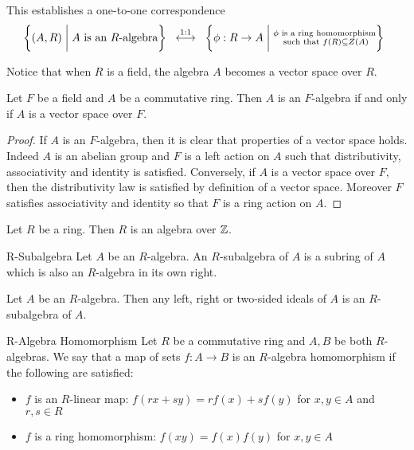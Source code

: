 \documentclass[a4paper]{article}
\begin{document}
This establishes a one-to-one correspondence $$\left\{(A,R)\;\bigg{|}\;A\text{ is an }R\text{-algebra}\right\}\;\;\overset{1:1}{\longleftrightarrow}\;\;\left\{\phi:R\to A\;\bigg{|}\;\substack{\phi\text{ is a ring homomorphism}\\\text{ such that }f(R)\subseteq Z(A)}\right\}\;\;$$

Notice that when $R$ is a field, the algebra $A$ becomes a vector space over $R$. 

\begin{lmm}{}{} Let $F$ be a field and $A$ be a commutative ring. Then $A$ is an $F$-algebra if and only if $A$ is a vector space over $F$. \tcbline
\begin{proof}
If $A$ is an $F$-algebra, then it is clear that properties of a vector space holds. Indeed $A$ is an abelian group and $F$ is a left action on $A$ such that distributivity, associativity and identity is satisfied. Conversely, if $A$ is a vector space over $F$, then the distributivity law is satisfied by definition of a vector space. Moreover $F$ satisfies associativity and identity so that $F$ is a ring action on $A$. 
\end{proof}
\end{lmm}

\begin{lmm}{}{} Let $R$ be a ring. Then $R$ is an algebra over $\mathbb{Z}$. 
\end{lmm}

\begin{defn}{R-Subalgebra}{} Let $A$ be an $R$-algebra. An $R$-subalgebra of $A$ is a subring of $A$ which is also an $R$-algebra in its own right. 
\end{defn}

\begin{prp}{}{} Let $A$ be an $R$-algebra. Then any left, right or two-sided ideals of $A$ is an $R$-subalgebra of $A$. 
\end{prp}

\begin{defn}{R-Algebra Homomorphism}{} Let $R$ be a commutative ring and $A,B$ be both $R$-algebras. We say that a map of sets $f:A\to B$ is an $R$-algebra homomorphism if the following are satisfied: 
\begin{itemize}
\item $f$ is an $R$-linear map: $f(rx+sy)=rf(x)+sf(y)$ for $x,y\in A$ and $r,s\in R$
\item $f$ is a ring homomorphism: $f(xy)=f(x)f(y)$ for $x,y\in A$
\end{itemize}
\end{defn}
\end{document}
